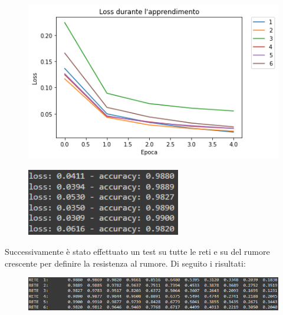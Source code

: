 \documentclass[12pt, a4paper]{article}
\begin{document}
\begin{figure}[H]
    \centering 
    \includegraphics[width=.9\textwidth]{ConfrontoConvoluzionale.png}
\end{figure}
\begin{figure}[H]
    \centering
    \includegraphics[width=0.6\textwidth]{AccuratezzaConvoluzionale.png}
\end{figure}

Successivamente è stato effettuato un test su tutte le reti e su del rumore crescente per definire la resistenza al rumore. Di seguito i risultati:
\begin{figure}[H]
    \centering
    \includegraphics[width=\textwidth]{RisultatiRumoreConvoluzionale.png}
\end{figure}

\newpage
\end{document}
